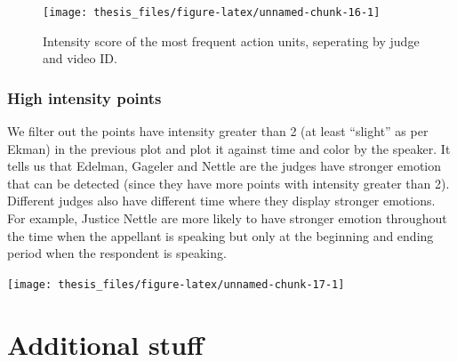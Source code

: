 \documentclass{monashthesis}
\begin{document}
\begin{figure}
\texttt{[image: thesis\_files/figure-latex/unnamed-chunk-16-1]} \caption{Intensity score of the most frequent action units, seperating by judge and video ID.\label{fig:intensity_by_au}}\label{fig:unnamed-chunk-16}
\end{figure}

\hypertarget{high-intensity-points}{%
\subsection{High intensity points}\label{high-intensity-points}}

We filter out the points have intensity greater than 2 (at least ``slight'' as per Ekman) in the previous plot and plot it against time and color by the speaker. It tells us that Edelman, Gageler and Nettle are the judges have stronger emotion that can be detected (since they have more points with intensity greater than 2). Different judges also have different time where they display stronger emotions. For example, Justice Nettle are more likely to have stronger emotion throughout the time when the appellant is speaking but only at the beginning and ending period when the respondent is speaking.

\texttt{[image: thesis\_files/figure-latex/unnamed-chunk-17-1]}

\appendix

\hypertarget{additional-stuff}{%
\chapter{Additional stuff}\label{additional-stuff}}
\end{document}
